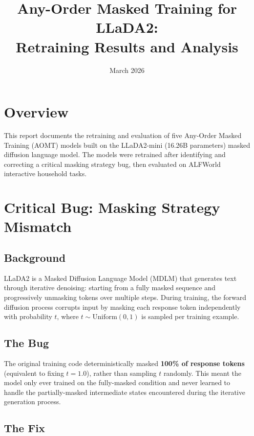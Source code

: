 \documentclass[11pt,a4paper]{article}
\title{Any-Order Masked Training for LLaDA2:\\Retraining Results and Analysis}
\author{}
\date{March 2026}
\begin{document}
\maketitle

\section{Overview}

This report documents the retraining and evaluation of five Any-Order Masked Training (AOMT) models built on the LLaDA2-mini (16.26B parameters) masked diffusion language model. The models were retrained after identifying and correcting a critical masking strategy bug, then evaluated on ALFWorld interactive household tasks.

\section{Critical Bug: Masking Strategy Mismatch}

\subsection{Background}
LLaDA2 is a Masked Diffusion Language Model (MDLM) that generates text through iterative denoising: starting from a fully masked sequence and progressively unmasking tokens over multiple steps. During training, the forward diffusion process corrupts input by masking each response token independently with probability $t$, where $t \sim \text{Uniform}(0,1)$ is sampled per training example.

\subsection{The Bug}
The original training code deterministically masked \textbf{100\% of response tokens} (equivalent to fixing $t=1.0$), rather than sampling $t$ randomly. This meant the model only ever trained on the fully-masked condition and never learned to handle the partially-masked intermediate states encountered during the iterative generation process.

\subsection{The Fix}
\end{document}
